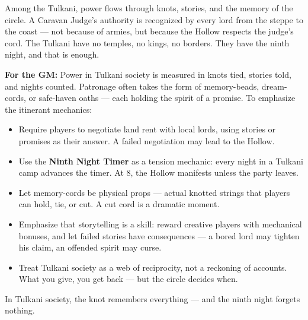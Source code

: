 \begin{tcolorbox}[colback=black!3,colframe=black!40!white,title={Patronage \& Power},breakable]
Among the Tulkani, power flows through knots, stories, and the memory of the circle. A Caravan Judge's authority is recognized by every lord from the steppe to the coast --- not because of armies, but because the Hollow respects the judge's cord. The Tulkani have no temples, no kings, no borders. They have the ninth night, and that is enough.

\textbf{For the GM:} Power in Tulkani society is measured in knots tied, stories told, and nights counted. Patronage often takes the form of memory-beads, dream-cords, or safe-haven oaths --- each holding the spirit of a promise. To emphasize the itinerant mechanics:
\begin{itemize}
\item Require players to negotiate land rent with local lords, using stories or promises as their answer. A failed negotiation may lead to the Hollow.
\item Use the \textbf{Ninth Night Timer } as a tension mechanic: every night in a Tulkani camp advances the timer. At $8$, the Hollow manifests unless the party leaves.
\item Let memory-cords be physical props --- actual knotted strings that players can hold, tie, or cut. A cut cord is a dramatic moment.
\item Emphasize that storytelling is a skill: reward creative players with mechanical bonuses, and let failed stories have consequences --- a bored lord may tighten his claim, an offended spirit may curse.
\item Treat Tulkani society as a web of reciprocity, not a reckoning of accounts. What you give, you get back --- but the circle decides when.
\end{itemize}
In Tulkani society, the knot remembers everything --- and the ninth night forgets nothing.
\end{tcolorbox}

